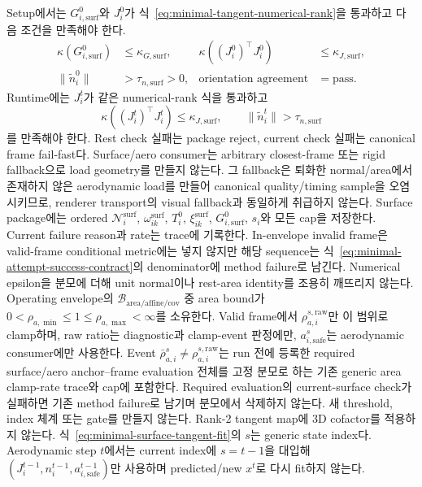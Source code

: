 \documentclass[11pt]{article}
\begin{document}
Setup에서는 \(G_{i,\mathrm{surf}}^0\)와 \(J_i^0\)가
식~\eqref{eq:minimal-tangent-numerical-rank}을 통과하고 다음 조건을 만족해야 한다.
\[
\begin{aligned}
  \kappa(G_{i,\mathrm{surf}}^0)&\leq\kappa_{G,\mathrm{surf}},&
  \kappa((J_i^0)^\top J_i^0)&\leq\kappa_{J,\mathrm{surf}},\\
  \|\widetilde n_i^0\|&>\tau_{n,\mathrm{surf}}>0,
  &\text{orientation agreement}&=\text{pass}.
\end{aligned}
\]
Runtime에는 \(J_i^t\)가 같은 numerical-rank 식을 통과하고
\[
  \kappa((J_i^t)^\top J_i^t)\leq\kappa_{J,\mathrm{surf}},\qquad
  \|\widetilde n_i^t\|>\tau_{n,\mathrm{surf}}
\]
를 만족해야 한다.
Rest check 실패는 package reject, current check 실패는 canonical frame fail-fast다.
Surface/aero consumer는 arbitrary closest-frame 또는 rigid fallback으로 load geometry를 만들지 않는다.
그 fallback은 퇴화한 normal/area에서 존재하지 않은 aerodynamic load를 만들어 canonical quality/timing
sample을 오염시키므로, renderer transport의 visual fallback과 동일하게 취급하지 않는다.
Surface package에는 ordered \(\mathcal N_i^{\mathrm{surf}}\), \(\omega_{ik}^{\mathrm{surf}}\),
\(T_i^0\), \(\xi_{ik}^{\mathrm{surf}}\), \(G_{i,\mathrm{surf}}^0\), \(s_i\)와 모든 cap을 저장한다.
Current failure reason과 rate는 trace에 기록한다. In-envelope invalid frame은 valid-frame conditional
metric에는 넣지 않지만 해당 sequence는 식~\eqref{eq:minimal-attempt-success-contract}의
denominator에 method failure로 남긴다.
Numerical epsilon을 분모에 더해 unit normal이나 rest-area identity를 조용히 깨뜨리지 않는다.
Operating envelope의 \(\mathcal B_{\mathrm{area/affine/cov}}\) 중 area bound가
\(0<\rho_{a,\min}\leq1\leq\rho_{a,\max}<\infty\)를 소유한다.
Valid frame에서 \(\rho_{a,i}^{s,\mathrm{raw}}\)만 이 범위로 clamp하며,
raw ratio는 diagnostic과 clamp-event 판정에만, \(a_{i,\mathrm{safe}}^s\)는 aerodynamic consumer에만 사용한다.
Event \(\bar\rho_{a,i}^s\neq\rho_{a,i}^{s,\mathrm{raw}}\)는 run 전에 등록한 required
surface/aero anchor--frame evaluation 전체를 고정 분모로 하는 기존 generic area clamp-rate trace와 cap에 포함한다.
Required evaluation의 current-surface check가 실패하면 기존 method failure로 남기며 분모에서 삭제하지 않는다.
새 threshold, index 체계 또는 gate를 만들지 않는다.
Rank-2 tangent map에 3D cofactor를 적용하지 않는다.
식~\eqref{eq:minimal-surface-tangent-fit}의 \(s\)는 generic state index다.
Aerodynamic step \(t\)에서는 current index에 \(s=t-1\)을 대입해
\((J_i^{t-1},n_i^{t-1},a_{i,\mathrm{safe}}^{t-1})\)만 사용하며
predicted/new \(x^t\)로 다시 fit하지 않는다.
\end{document}
